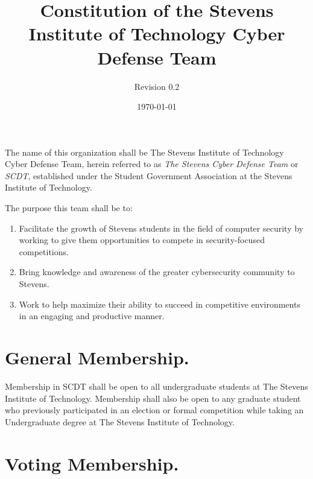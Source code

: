 \documentclass[12pt]{constitution}
\begin{document}
\title{Constitution of the Stevens Institute of Technology Cyber Defense Team}
\author{Revision 0.2} 
\date{\today}
\maketitle

\setcounter{tocdepth}{0}
\tableofcontents

\newpage

\label{art:NAME}

The name of this organization shall be The Stevens Institute of Technology Cyber
Defense Team, herein referred to as \textit{The Stevens Cyber Defense Team} or
\textit{SCDT}, established under the Student Government Association at the
Stevens Institute of Technology.

\label{art:GOALS}

The purpose this team shall be to:

\begin{enumerate}
    \item Facilitate the growth of Stevens students in the field of computer
    security by working to give them opportunities to compete in security-focused
    competitions.
    \item Bring knowledge and awareness of the greater cybersecurity community
    to Stevens.
    \item Work to help maximize their ability to succeed in competitive
    environments in an engaging and productive manner.
\end{enumerate}

\label{art:MEMBERSHIP}

\section{General Membership.}\label{sec:GENERAL-MEMBERSHIP}

Membership in SCDT shall be open to all undergraduate students at The Stevens
Institute of Technology. Membership shall also be open to any graduate student
who previously participated in an election or formal competition while taking an
Undergraduate degree at The Stevens Institute of Technology.

\section{Voting Membership.}\label{sec:VOTING-MEMBERSHIP}
\end{document}

